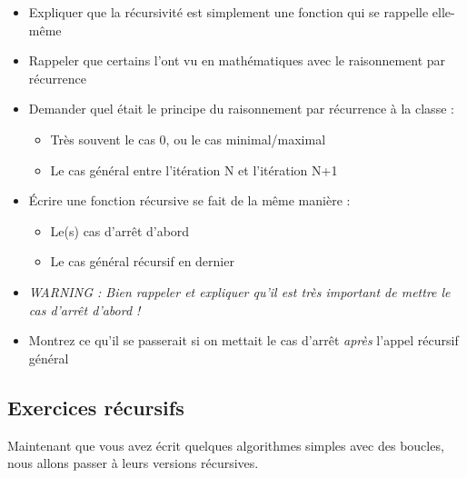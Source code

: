 \documentclass[11pt,a4paper]{article}
\begin{document}
\begin{itemize}
\item Expliquer que la récursivité est simplement une fonction qui se rappelle elle-même
\item Rappeler que certains l'ont vu en mathématiques avec le raisonnement par récurrence
\item Demander quel était le principe du raisonnement par récurrence à la classe :
  \begin{itemize}[label=$\bullet$]
  \item Très souvent le cas 0, ou le cas minimal/maximal
  \item Le cas général entre l'itération N et l'itération N+1
  \end{itemize}
\item \'Ecrire une fonction récursive se fait de la même manière :
  \begin{itemize}[label=$\bullet$]
  \item Le(s) cas d'arrêt d'abord
  \item Le cas général récursif en dernier
  \end{itemize}
\item \textit{WARNING : Bien rappeler et expliquer qu'il est très important de mettre le cas d'arrêt d'abord !}
\item Montrez ce qu'il se passerait si on mettait le cas d'arrêt \textit{après} l'appel récursif général
\end{itemize}

\bigskip


\subsection{Exercices récursifs}

Maintenant que vous avez écrit quelques algorithmes simples avec des boucles, nous allons passer à leurs versions récursives.

\bigskip


\bigskip
\end{document}
